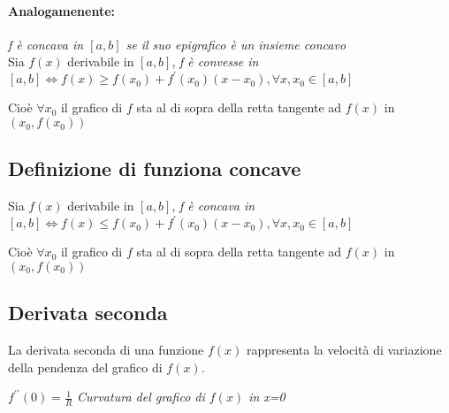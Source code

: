 \documentclass{book}
\begin{document}
\paragraph{Analogamenente:} \textit{f è concava in $[a,b]$ se il suo epigrafico
è un insieme concavo}\\
Sia $f(x)$ derivabile in $[a,b]$, \textit{f è convesse in
$[a,b]\Leftrightarrow f(x)\geq f(x_0)+f^\prime(x_0)(x-x_0), \forall
x,x_0\in[a,b]$}
\begin{center}
	Cioè $\forall x_0$ il grafico di $f$ sta al di sopra della retta tangente
	ad $f(x)$ in $(x_0,f(x_0))$
\end{center}
\subsection{Definizione di funziona concave}
Sia $f(x)$ derivabile in $[a,b]$, \textit{f è concava in
$[a,b]\Leftrightarrow f(x)\leq f(x_0)+f^\prime(x_0)(x-x_0), \forall
x,x_0\in[a,b]$}
\begin{center}
	Cioè $\forall x_0$ il grafico di $f$ sta al di sopra della retta tangente
	ad $f(x)$ in $(x_0,f(x_0))$
\end{center}
\subsection{Derivata seconda}
La derivata seconda di una funzione $f(x)$ rappresenta la velocità di
variazione della pendenza del grafico di $f(x)$.
\begin{center}
	$f^{\prime\prime}(0)=\frac{1}{R}$ \textit{Curvatura del grafico di $f(x)$
	in x=0}
\end{center}
\end{document}
